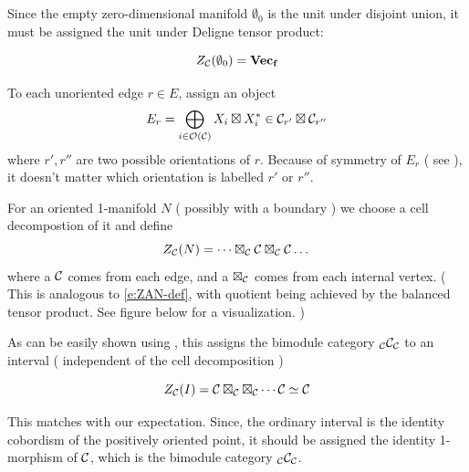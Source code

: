 Since the empty zero-dimensional manifold $\emptyset_0$ is the unit under disjoint union,
it must be assigned the unit under Deligne tensor product:

$$
Z_{\mathcal{C}}( \emptyset_0)=\mathbf{Vec_f}
$$

To each unoriented edge $r \in E$, assign an object
\[
E_r = \bigoplus_{i \in \mathcal{O}(\mathcal{C})}  X_i \boxtimes X_i^* \in \mathcal{C}_{r'} \boxtimes \mathcal{C}_{r''}
\]
where $r',r''$ are two possible orientations of $r$. Because of symmetry of $E_r$ ( see  ),
 it doesn't matter which orientation is labelled $r'$ or $r''$.

For an oriented 1-manifold $N$ ( possibly with a boundary ) we choose a cell decompostion of it and define
\[
Z_{\mathcal{C}} (N) = \dots \boxtimes_{\mathcal{C}} \mathcal{C} \boxtimes_{\mathcal{C}} \mathcal{C} \dots
\]
where a $\mathcal{C}$ comes from each edge, and a $\boxtimes_{\mathcal{C}}$ comes from each internal vertex. ( This is analogous to 
\eqref{e:ZAN-def}, with quotient being achieved by the balanced tensor product. See figure below for a visualization. )

\begin{center}
\end{center}

As can be easily shown using , this assigns the bimodule category 
$_{\mathcal{C}} \mathcal{C}_{\mathcal{C}}$ to an interval ( independent of the cell decomposition )

$$
Z_{\mathcal{C}}(I) =  \mathcal{C} \boxtimes_{\mathcal{C}} \boxtimes_{\mathcal{C}} \cdots \mathcal{C} \simeq \mathcal{C}
$$


This matches with our expectation. Since, the ordinary interval is the identity cobordism of the 
positively oriented point, it should be assigned the identity 1-morphism of $\mathcal{C}$, which is 
the bimodule category $_{\mathcal{C}} \mathcal{C}_{\mathcal{C}}$.

